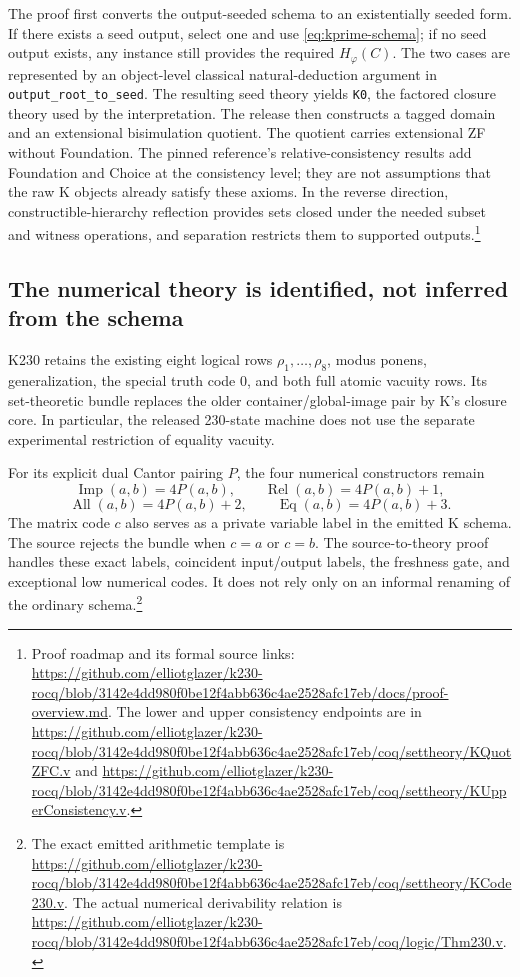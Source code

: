 The proof first converts the output-seeded schema to an existentially
seeded form.  If there exists a seed output, select one and use
\eqref{eq:kprime-schema}; if no seed output exists, any instance still
provides the required $H_\varphi(C)$.  The two cases are represented by
an object-level classical natural-deduction argument in
\texttt{output\_root\_to\_seed}.  The resulting seed theory yields
\texttt{K0}, the factored closure theory used by the interpretation.
The release then constructs a tagged domain and an extensional
bisimulation quotient.  The quotient carries extensional ZF without
Foundation.  The pinned reference's relative-consistency results add
Foundation and Choice at the consistency level; they are not assumptions
that the raw K objects already satisfy these axioms.  In the reverse
direction, constructible-hierarchy reflection provides sets closed under
the needed subset and witness operations, and separation restricts them
to supported outputs.\footnote{Proof roadmap and its formal source links:
\url{https://github.com/elliotglazer/k230-rocq/blob/3142e4dd980f0be12f4abb636c4ae2528afc17eb/docs/proof-overview.md}.
The lower and upper consistency endpoints are in
\url{https://github.com/elliotglazer/k230-rocq/blob/3142e4dd980f0be12f4abb636c4ae2528afc17eb/coq/settheory/KQuotZFC.v}
and
\url{https://github.com/elliotglazer/k230-rocq/blob/3142e4dd980f0be12f4abb636c4ae2528afc17eb/coq/settheory/KUpperConsistency.v}.}

\subsection{The numerical theory is identified, not inferred from the schema}

K230 retains the existing eight logical rows $\rho_1,\ldots,\rho_8$,
modus ponens, generalization, the special truth code $0$, and both full
atomic vacuity rows.  Its set-theoretic bundle replaces the older
container/global-image pair by K's closure core.  In particular, the
released 230-state machine does not use the separate experimental
restriction of equality vacuity.

For its explicit dual Cantor pairing $P$, the four numerical constructors
remain
\[
 \operatorname{Imp}(a,b)=4P(a,b),\qquad
 \operatorname{Rel}(a,b)=4P(a,b)+1,
\]
\[
 \operatorname{All}(a,b)=4P(a,b)+2,\qquad
 \operatorname{Eq}(a,b)=4P(a,b)+3.
\]
The matrix code $c$ also serves as a private variable label in the
emitted K schema.  The source rejects the bundle when $c=a$ or $c=b$.
The source-to-theory proof handles these exact labels, coincident
input/output labels, the freshness gate, and exceptional low numerical
codes.  It does not rely only on an informal renaming of the ordinary
schema.\footnote{The exact emitted arithmetic template is
\url{https://github.com/elliotglazer/k230-rocq/blob/3142e4dd980f0be12f4abb636c4ae2528afc17eb/coq/settheory/KCode230.v}.
The actual numerical derivability relation is
\url{https://github.com/elliotglazer/k230-rocq/blob/3142e4dd980f0be12f4abb636c4ae2528afc17eb/coq/logic/Thm230.v}.}

